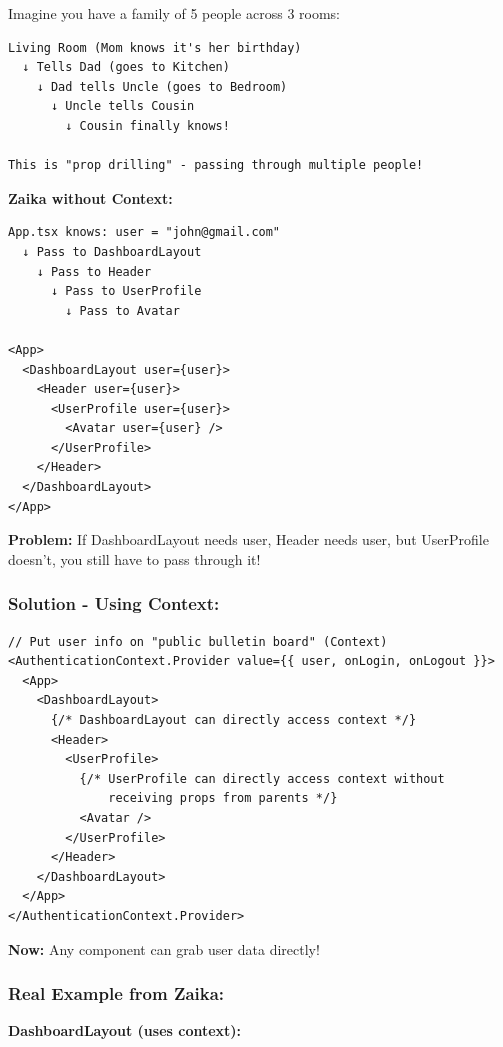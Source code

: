 \documentclass[12pt]{article}
\begin{document}
Imagine you have a family of 5 people across 3 rooms:

\begin{lstlisting}
Living Room (Mom knows it's her birthday)
  ↓ Tells Dad (goes to Kitchen)
    ↓ Dad tells Uncle (goes to Bedroom)
      ↓ Uncle tells Cousin
        ↓ Cousin finally knows!

This is "prop drilling" - passing through multiple people!
\end{lstlisting}

\textbf{Zaika without Context:}

\begin{lstlisting}
App.tsx knows: user = "john@gmail.com"
  ↓ Pass to DashboardLayout
    ↓ Pass to Header
      ↓ Pass to UserProfile
        ↓ Pass to Avatar

<App>
  <DashboardLayout user={user}>
    <Header user={user}>
      <UserProfile user={user}>
        <Avatar user={user} />
      </UserProfile>
    </Header>
  </DashboardLayout>
</App>
\end{lstlisting}

\textbf{Problem:} If DashboardLayout needs user, Header needs user, but UserProfile doesn't, you still have to pass through it!

\subsubsection*{Solution - Using Context:}

\begin{lstlisting}
// Put user info on "public bulletin board" (Context)
<AuthenticationContext.Provider value={{ user, onLogin, onLogout }}>
  <App>
    <DashboardLayout>
      {/* DashboardLayout can directly access context */}
      <Header>
        <UserProfile>
          {/* UserProfile can directly access context without 
              receiving props from parents */}
          <Avatar />
        </UserProfile>
      </Header>
    </DashboardLayout>
  </App>
</AuthenticationContext.Provider>
\end{lstlisting}

\textbf{Now:} Any component can grab user data directly!

\subsubsection*{Real Example from Zaika:}

\textbf{DashboardLayout (uses context):}
\end{document}
